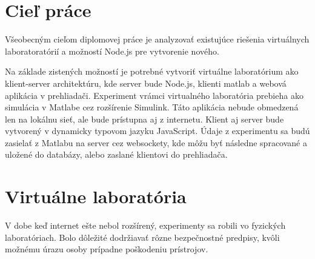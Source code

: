 
\section{Cieľ práce}
Všeobecným cieľom diplomovej práce je analyzovať existujúce riešenia virtuálnych laboratoratórií a možností Node.js pre vytvorenie nového.

Na základe zistených možností je potrebné vytvoriť virtuálne laboratórium ako klient-server architektúru, kde server bude Node.js, klienti matlab a webová aplikácia v prehliadači. Experiment vrámci virtualného laboratória prebieha ako simulácia v Matlabe cez rozšírenie Simulink. Táto aplikácia nebude obmedzená len na lokálnu sieť, ale bude prístupna aj z internetu. Klient aj server bude vytvorený v dynamicky typovom jazyku JavaScript. Údaje z experimentu sa budú zasielať z Matlabu na server cez websockety, kde môžu byť následne spracované a uložené do databázy, alebo zaslané klientovi do prehliadača.


\section{Virtuálne laboratória}
\indent V dobe keď internet ešte nebol rozšírený, experimenty sa robili vo fyzických laboratóriach. Bolo dôležité dodržiavať rôzne bezpečnostné predpisy, kvôli možnému úrazu osoby prípadne poškodeniu prístrojov.

